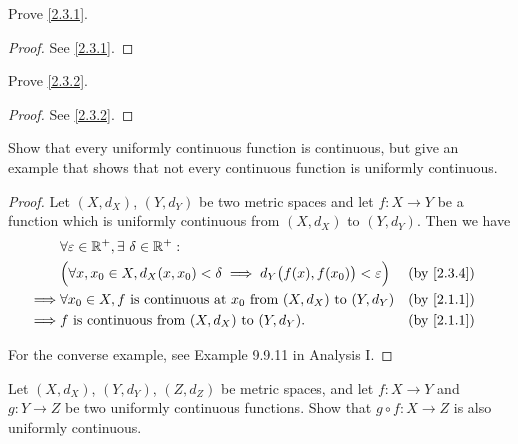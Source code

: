 \exercisesection

\begin{ex}\label{ex:2.3.1}
  Prove \cref{2.3.1}.
\end{ex}

\begin{proof}
  See \cref{2.3.1}.
\end{proof}

\begin{ex}\label{ex:2.3.2}
  Prove \cref{2.3.2}.
\end{ex}

\begin{proof}
  See \cref{2.3.2}.
\end{proof}

\begin{ex}\label{ex:2.3.3}
  Show that every uniformly continuous function is continuous, but give an example that shows that not every continuous function is uniformly continuous.
\end{ex}

\begin{proof}
  Let \((X, d_X)\), \((Y, d_Y)\) be two metric spaces and let \(f : X \to Y\) be a function which is uniformly continuous from \((X, d_X)\) to \((Y, d_Y)\).
  Then we have
  \begin{align*}
             & \forall \varepsilon \in \R^+, \exists\ \delta \in \R^+ :                                                              \\
             & \Big(\forall x, x_0 \in X, d_X(x, x_0) < \delta \implies d_Y\big(f(x), f(x_0)\big) < \varepsilon\Big) &  & \by{2.3.4} \\
    \implies & \forall x_0 \in X, f \text{ is continuous at } x_0 \text{ from } (X, d_X) \text{ to } (Y, d_Y)        &  & \by{2.1.1} \\
    \implies & f \text{ is continuous from } (X, d_X) \text{ to } (Y, d_Y).                                          &  & \by{2.1.1}
  \end{align*}

  For the converse example, see Example 9.9.11 in Analysis I.
\end{proof}

\begin{ex}\label{ex:2.3.4}
  Let \((X, d_X)\), \((Y, d_Y)\), \((Z, d_Z)\) be metric spaces, and let \(f : X \to Y\) and \(g : Y \to Z\) be two uniformly continuous functions.
  Show that \(g \circ f : X \to Z\) is also uniformly continuous.
\end{ex}

